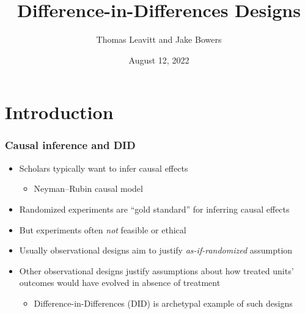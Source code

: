 \documentclass[table, xcolor = {dvipsnames}, 9pt]{beamer}
\title[]{Difference-in-Differences Designs} %
\author{Thomas Leavitt and Jake Bowers} %
\institute[] %
{
\medskip
}
\date{August 12, 2022} %
\theoremstyle{plain}
\begin{document}
\begin{frame}
\titlepage %
\end{frame}


\section{Introduction}
\begin{frame}[t]
\frametitle{Causal inference and DID}
\vfill
\begin{itemize}
\item Scholars typically want to infer causal effects \vfill
\begin{itemize}
\item Neyman--Rubin causal model \citep{neyman1923,rubin1974}  \vfill
\end{itemize} 
\item Randomized experiments are ``gold standard'' for inferring causal effects \vfill
\item But experiments often \textit{not} feasible or ethical \vfill
\item Usually observational designs aim to justify \textit{as-if-randomized} assumption \vfill
\item Other observational designs justify assumptions about how treated units' outcomes would have evolved in absence of treatment \vfill
\begin{itemize}
\item Difference-in-Differences (DID) is archetypal example of such designs \vfill
\end{itemize} 
\end{itemize}
\vfill
\end{frame}
\end{document}
